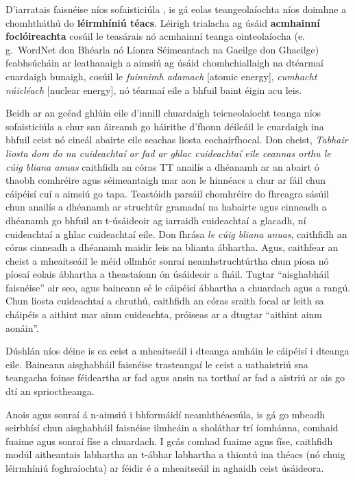 \begin{multicols}{2}
D’iarratais faisnéise níos sofaisticiúla , is gá eolas teangeolaíochta níos doimhne a chomhtháthú do \textbf{léirmhíniú téacs}. Léirigh trialacha ag úsáid \textbf{acmhainní foclóireachta} cosúil le teasárais nó acmhainní teanga ointeolaíocha (e.\,g.~WordNet don Bhéarla nó Líonra Séimeantach na Gaeilge don Ghaeilge) feabhsúcháin ar leathanaigh a aimsiú ag úsáid chomhchiallaigh na dtéarmaí cuardaigh bunaigh, cosúil le \textit{fuinnimh adamach} [atomic energy], \textit{cumhacht núicléach} [nuclear energy], nó téarmaí eile a bhfuil baint éigin acu leis.

Beidh ar an gcéad ghlúin eile d’innill chuardaigh teicneolaíocht teanga níos sofaisticiúla a chur san áireamh go háirithe d’fhonn déileáil le cuardaigh ina bhfuil ceist nó cineál abairte eile seachas liosta eochairfhocal. Don cheist, \textit{Tabhair liosta dom do na cuideachtaí ar fad ar ghlac cuideachtaí eile ceannas orthu le cúig bliana anuas} caithfidh an córas TT anailís a dhéanamh ar an abairt ó thaobh comhréire agus séimeantaigh mar aon le hinnéacs a chur ar fáil chun cáipéisí cuí a aimsiú go tapa. Teastóidh parsáil chomhréire do fhreagra sásúil chun anailís a dhéanamh ar struchtúr gramadaí na habairte agus cinneadh a dhéanamh go bhfuil an t-úsáideoir ag iarraidh cuideachtaí a glacadh, ní cuideachtaí a ghlac cuideachtaí eile. Don fhrása \textit{le cúig bliana anuas}, caithfidh an córas cinneadh a dhéanamh maidir leis na blianta ábhartha. Agus, caithfear an cheist a mheaitseáil le méid ollmhór sonraí neamhstruchtúrtha chun píosa nó píosaí eolais ábhartha a theastaíonn ón úsáideoir a fháil. Tugtar ``aisghabháil faisnéise'' air seo, agus baineann sé le cáipéisí ábhartha a chuardach agus a rangú. Chun liosta cuideachtaí a chruthú, caithfidh an córas sraith focal ar leith sa cháipéis a aithint mar ainm cuideachta, próiseas ar a dtugtar ``aithint ainm aonáin''.


Dúshlán níos déine is ea ceist a mheaitseáil i dteanga amháin le cáipéisí i dteanga eile. Baineann aisghabháil faisnéise trasteangaí  le ceist a uathaistriú sna teangacha foinse féideartha ar fad agus ansin na torthaí ar fad a aistriú ar ais go dtí an sprioctheanga. 

Anois agus sonraí á n-aimsiú i bhformáidí neamhthéacsúla, is gá go mbeadh seirbhísí chun aisghabháil faisnéise ilmheáin a sholáthar trí íomhánna, comhaid fuaime agus sonraí físe a chuardach. I gcás comhad fuaime agus físe, caithfidh modúl aitheantais labhartha an t-ábhar labhartha a thiontú ina théacs (nó chuig léirmhíniú foghraíochta) ar féidir é a mheaitseáil in aghaidh ceist úsáideora.


\end{multicols}
